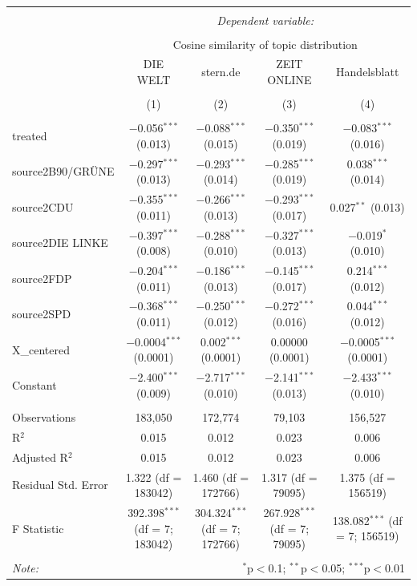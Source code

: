 \documentclass[
]{article}
\begin{document}
\begin{table}[!htbp] \centering 
  \caption{} 
  \label{} 
\tiny 
\begin{tabular}{@{\extracolsep{5pt}}lcccc} 
\\[-1.8ex]\hline 
\hline \\[-1.8ex] 
 & \multicolumn{4}{c}{\textit{Dependent variable:}} \\ 
\cline{2-5} 
\\[-1.8ex] & \multicolumn{4}{c}{Cosine similarity of topic distribution} \\ 
 & DIE WELT & stern.de & ZEIT ONLINE & Handelsblatt \\ 
\\[-1.8ex] & (1) & (2) & (3) & (4)\\ 
\hline \\[-1.8ex] 
 treated & $-$0.056$^{***}$ (0.013) & $-$0.088$^{***}$ (0.015) & $-$0.350$^{***}$ (0.019) & $-$0.083$^{***}$ (0.016) \\ 
  source2B90/GRÜNE & $-$0.297$^{***}$ (0.013) & $-$0.293$^{***}$ (0.014) & $-$0.285$^{***}$ (0.019) & 0.038$^{***}$ (0.014) \\ 
  source2CDU & $-$0.355$^{***}$ (0.011) & $-$0.266$^{***}$ (0.013) & $-$0.293$^{***}$ (0.017) & 0.027$^{**}$ (0.013) \\ 
  source2DIE LINKE & $-$0.397$^{***}$ (0.008) & $-$0.288$^{***}$ (0.010) & $-$0.327$^{***}$ (0.013) & $-$0.019$^{*}$ (0.010) \\ 
  source2FDP & $-$0.204$^{***}$ (0.011) & $-$0.186$^{***}$ (0.013) & $-$0.145$^{***}$ (0.017) & 0.214$^{***}$ (0.012) \\ 
  source2SPD & $-$0.368$^{***}$ (0.011) & $-$0.250$^{***}$ (0.012) & $-$0.272$^{***}$ (0.016) & 0.044$^{***}$ (0.012) \\ 
  X\_centered & $-$0.0004$^{***}$ (0.0001) & 0.002$^{***}$ (0.0001) & 0.00000 (0.0001) & $-$0.0005$^{***}$ (0.0001) \\ 
  Constant & $-$2.400$^{***}$ (0.009) & $-$2.717$^{***}$ (0.010) & $-$2.141$^{***}$ (0.013) & $-$2.433$^{***}$ (0.010) \\ 
 \hline \\[-1.8ex] 
Observations & 183,050 & 172,774 & 79,103 & 156,527 \\ 
R$^{2}$ & 0.015 & 0.012 & 0.023 & 0.006 \\ 
Adjusted R$^{2}$ & 0.015 & 0.012 & 0.023 & 0.006 \\ 
Residual Std. Error & 1.322 (df = 183042) & 1.460 (df = 172766) & 1.317 (df = 79095) & 1.375 (df = 156519) \\ 
F Statistic & 392.398$^{***}$ (df = 7; 183042) & 304.324$^{***}$ (df = 7; 172766) & 267.928$^{***}$ (df = 7; 79095) & 138.082$^{***}$ (df = 7; 156519) \\ 
\hline 
\hline \\[-1.8ex] 
\textit{Note:}  & \multicolumn{4}{r}{$^{*}$p$<$0.1; $^{**}$p$<$0.05; $^{***}$p$<$0.01} \\ 
\end{tabular} 
\end{table}
\end{document}
